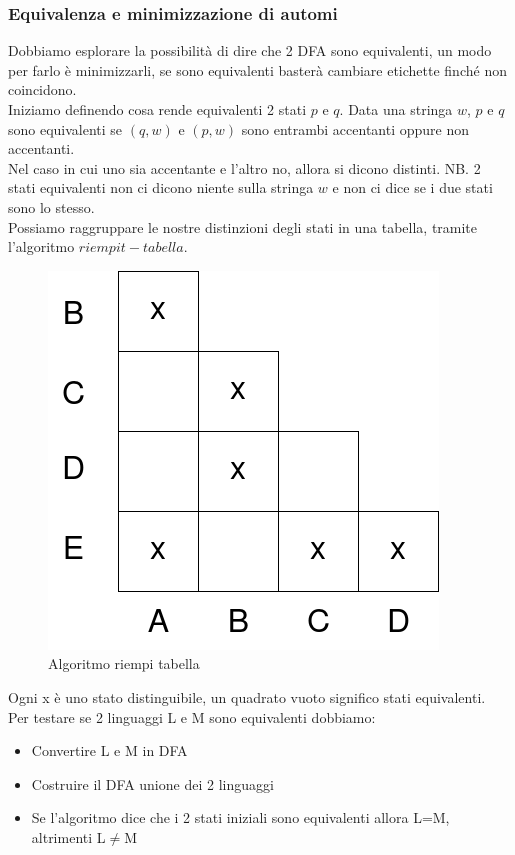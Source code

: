 \documentclass[12pt]{article}
\newcommand{\circumdelta}{%
  \leavevmode\vbox{
    \offinterlineskip
    \ialign{%
      \hfil##\hfil\cr
      \^{}\cr\noalign{\vskip-1ex}
      $\delta$\cr
    }
  }%
}
\begin{document}
\subsubsection{Equivalenza e minimizzazione di automi}
Dobbiamo esplorare la possibilità di dire che 2 DFA sono equivalenti, un modo per farlo è minimizzarli, se sono equivalenti basterà cambiare etichette finché non coincidono.
\\ Iniziamo definendo cosa rende equivalenti 2 stati $p$ e $q$. Data una stringa $w$, $p$ e $q$ sono equivalenti se \circumdelta$(q,w)$ e \circumdelta$(p,w)$ sono entrambi accentanti oppure non accentanti. 
\\ Nel caso in cui uno sia accentante e l'altro no, allora si dicono distinti. NB. 2 stati equivalenti non ci dicono niente sulla stringa $w$ e non ci dice se i due stati sono lo stesso. 
\\ Possiamo raggruppare le nostre distinzioni degli stati in una tabella, tramite l'algoritmo $riempit-tabella$.

\begin{figure}[ht]
	\includegraphics[scale = 0.3]{media/riemp_tab.png}
	\centering
	\caption{Algoritmo riempi tabella}
\end{figure}
Ogni x è uno stato distinguibile, un quadrato vuoto significo stati equivalenti.
\\ Per testare se 2 linguaggi L e M sono equivalenti dobbiamo: 
\begin{itemize}
  \item Convertire L e M in DFA 
  \item Costruire il DFA unione dei 2 linguaggi
  \item Se l'algoritmo dice che i 2 stati iniziali sono equivalenti allora L=M, altrimenti L$\ne$M
\end{itemize}
\end{document}
